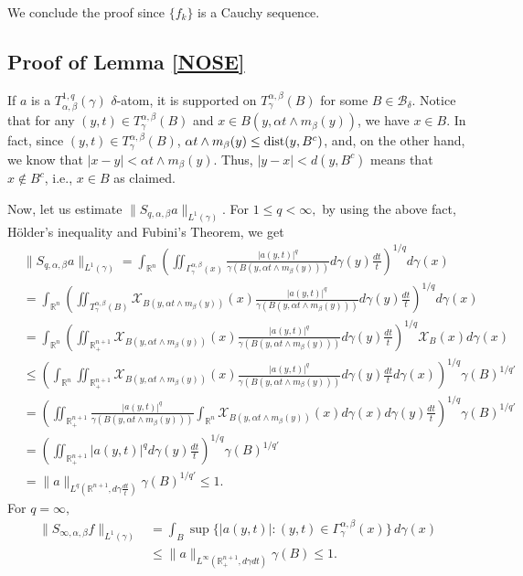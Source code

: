 \documentclass[leqno,11pt]{amsart}
\theoremstyle{plain}
\theoremstyle{remark}
\begin{document}
{{{We conclude the proof since $\{f_k\}$ is a Cauchy sequence.
 



\subsection{Proof of Lemma \ref{NOSE}}\label{atomitos}

If $a$ is a $T^{1,q}_{\alpha, \beta}(\gamma)$ $\delta$-atom, it is supported on $T_\gamma^{\alpha, \beta}(B)$ for some $B\in \mathscr{B}_\delta$. Notice that for any $(y,t)\in T_\gamma^{\alpha, \beta}(B)$ and $x\in B(y, \alpha t\wedge m_\beta(y))$, we have $x\in B$. In fact, since $(y,t)\in T_\gamma^{\alpha, \beta} (B)$, $\alpha  t\wedge m_\beta(y)\leq \hbox{dist}(y,B^c)$, and, on the other hand, we know that $|x-y|<\alpha t\wedge m_\beta(y)$. Thus, $|y-x|< d(y,B^c)$ means that $x\notin B^c$, i.e., $x\in B$ as claimed.

Now, let us estimate $\|S_{q,\alpha, \beta}a\|_{L^1(\gamma)}$. For $1\le q<\infty,$ by using the above fact, H\"older's inequality and Fubini's Theorem, we get
\begin{align*}
   & \|S_{q, \alpha, \beta}a\|_{L^1(\gamma)}=\int_{\mathbb{R}^n} \left(\iint_{\Gamma_\gamma^{\alpha, \beta}(x)} \frac{|a(y,t)|^q}{\gamma(B(y,\alpha t\wedge m_\beta(y)))} d\gamma(y)\frac{dt}{t}\right)^{1/q} d\gamma(x)\\
    &=\int_{\mathbb{R}^n} \left(\iint_{T_\gamma^{\alpha, \beta} (B)} \mathcal{X}_{B(y,\alpha t\wedge m_\beta(y))}(x) \frac{|a(y,t)|^q}{\gamma(B(y,\alpha t\wedge m_\beta(y)))} d\gamma(y)\frac{dt}{t}\right)^{1/q} d\gamma(x)\\
    &=\int_{\mathbb{R}^n} \left(\iint_{\mathbb{R}^{n+1}_+} \mathcal{X}_{B(y,\alpha t\wedge m_\beta(y))}(x) \frac{|a(y,t)|^q}{\gamma(B(y,\alpha t\wedge m_\beta(y)))} d\gamma(y)\frac{dt}{t}\right)^{1/q} \mathcal{X}_B(x) d\gamma(x)\\
    &\leq \left(\int_{\mathbb{R}^n} \iint_{\mathbb{R}^{n+1}_+} \mathcal{X}_{B(y,\alpha t\wedge m_\beta(y))}(x) \frac{|a(y,t)|^q}{\gamma(B(y,\alpha t\wedge m_\beta(y)))} d\gamma(y)\frac{dt}{t} d\gamma(x)\right)^{1/q} \gamma(B)^{1/q'}\\
    &=\left(\iint_{\mathbb{R}^{n+1}_+} \frac{|a(y,t)|^q}{\gamma(B(y,\alpha t\wedge m_\beta(y)))} \int_{\mathbb{R}^n}  \mathcal{X}_{B(y,\alpha t\wedge m_\beta(y))}(x) d\gamma(x) d\gamma(y)\frac{dt}{t} \right)^{1/q} \gamma(B)^{1/q'}\\
    &=\left(\iint_{\mathbb{R}^{n+1}_+}|a(y,t)|^q d\gamma(y)\frac{dt}{t} \right)^{1/q} \gamma(B)^{1/q'}\\
    &=\|a\|_{L^q(\mathbb{R}^{n+1}, d\gamma \frac{dt}{t})}\gamma(B)^{1/q'}\leq 1.
\end{align*}
For $q=\infty,$ \begin{align*}\|S_{\infty, \alpha, \beta}f\|_{L^1(\gamma)}&=\int_{B}\sup\{|a(y,t)|:(y,t)\in \Gamma^{\alpha,\beta}_\gamma(x)\}\, d\gamma(x)\\ &\le \|a\|_{L^\infty(\mathbb{R}^{n+1}_+, d\gamma dt)}\gamma(B)\le 1.\end{align*}\qedhere

}}}
\end{document}
